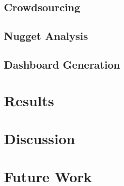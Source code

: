 \documentclass{sigchi}
\begin{document}
\subsection{Crowdsourcing}

\subsection{Nugget Analysis}

\subsection{Dashboard Generation}

\section{Results}

\section{Discussion}

\section{Future Work}



\end{document}
